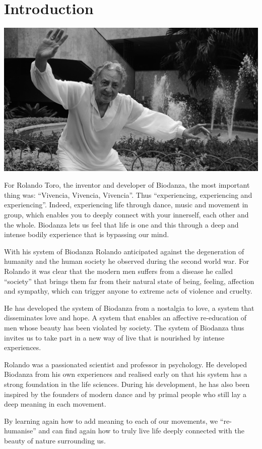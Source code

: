 \documentclass[
]{article}
\author{}
\date{\vspace{-2.5em}}
\begin{document}
{
\setcounter{tocdepth}{2}
\tableofcontents
}
\hypertarget{intro}{%
\section{Introduction}\label{intro}}

\includegraphics[width=0.45\linewidth]{./figs/rolando}

For Rolando Toro, the inventor and developer of Biodanza, the most important thing was: ``Vivencia, Vivencia, Vivencia''. Thus ``experiencing, experiencing and experiencing''. Indeed, experiencing life through dance, music and movement in group, which enables you to deeply connect with your innerself, each other and the whole. Biodanza lets us feel that life is one and this through a deep and intense bodily experience that is bypassing our mind.

With his system of Biodanza Rolando anticipated against the degeneration of humanity and the human society he observed during the second world war. For Rolando it was clear that the modern men suffers from a disease he called ``society'' that brings them far from their natural state of being, feeling, affection and sympathy, which can trigger anyone to extreme acts of violence and cruelty.

He has developed the system of Biodanza from a nostalgia to love, a system that disseminates love and hope. A system that enables an affective re-education of men whose beauty has been violated by society.
The system of Biodanza thus invites us to take part in a new way of live that is nourished by intense experiences.

Rolando was a passionated scientist and professor in psychology. He developed Biodanza from his own experiences and realised early on that his system has a strong foundation in the life sciences. During his development, he has also been inspired by the founders of modern dance and by primal people who still lay a deep meaning in each movement.

By learning again how to add meaning to each of our movements, we ``re-humanise'' and can find again how to truly live life deeply connected with the beauty of nature surrounding us.
\end{document}
